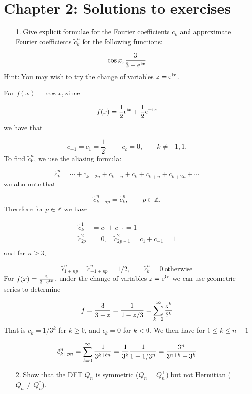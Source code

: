 \documentclass[12pt,a4paper]{article}
\begin{document}
\section{Chapter 2: Solutions to exercises}
\begin{itemize}
\item[1. ] Give explicit formulae for the Fourier coefficients $c_k$ and approximate Fourier coefficients $\tilde{c}_k^n$ for the following functions:

\end{itemize}
\[
\cos x,  {3 \over 3 - {\rm e}^{{\rm i }x}}
\]
Hint: You may wish to try the change of variables $z = {\rm e}^{{\rm i}x}$.

For $f(x) = \cos x$, since 

\[
f(x) = \frac{1}{2}{\rm e}^{{\rm i}x} + \frac{1}{2}{\rm e}^{-{\rm i}x}
\]
we have that

\[
c_{-1} = c_1 = \frac{1}{2}, \qquad c_k = 0, \qquad k \neq -1, 1.
\]
To find $\tilde{c}^n_k$, we use the aliasing formula:

\[
\tilde{c}^{n}_k = \cdots + c_{k-2n}+c_{k-n}+c_k+c_{k+n}+c_{k+2n}+\cdots
\]
we also note that

\[
\tilde{c}^{n}_{k+np} = \tilde{c}^{n}_k, \qquad p \in \mathbb{Z}.
\]
Therefore for $p \in \mathbb{Z}$ we have


\begin{align*}
\tilde{c}^{1}_k &= c_1 + c_{-1} = 1 \\
\tilde{c}^{2}_{2p} &= 0, \quad \tilde{c}^{2}_{2p+1} = c_1 + c_{-1} = 1 \\
\end{align*}
and for $n \geq 3$,

\[
\tilde{c}^{n}_{1+np} = \tilde{c}^{n}_{-1+np} = 1/2, \qquad \tilde{c}^{n}_{k} = 0 \: \text{otherwise} 
\]
For $f(x) = {3 \over 3 - {\rm e}^{{\rm i }x}}$, under the change of variables $z = {\rm e}^{{\rm i}x}$ we can use geometric series to determine

\[
f = {3 \over 3 - z} = {1 \over 1- z/3} = \sum_{k=0}^{\infty} {z^k \over 3^k}
\]
That is $c_k = 1/3^k$ for $k \ensuremath{\geq} 0$, and $c_k = 0$ for $k < 0$. We then have for $0 \ensuremath{\leq} k \ensuremath{\leq} n-1$

\[
\tilde{c}_{k+pn}^n =  \sum_{\ell=0}^{\infty} {1 \over 3^{k+\ell n}} = {1 \over 3^k} {1 \over 1 - 1/3^n} = {3^n \over 3^{n+k} - 3^k}
\]
\begin{itemize}
\item[2. ] Show that the DFT $Q_n$ is symmetric ($Q_n = Q_n^{\top}$) but not Hermitian ($Q_n \neq Q_n^*$).

\end{itemize}
\end{document}
